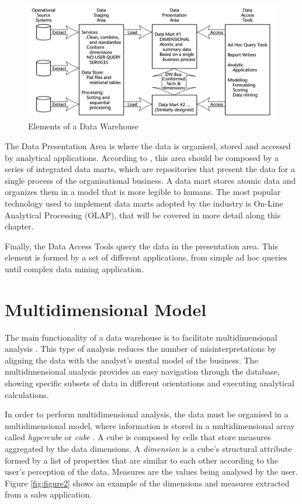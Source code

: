 \begin{figure}[ht]
\centering
\includegraphics[width=.8\textwidth]{../elements_data_warehouse.png}
\caption{Elements of a Data Warehouse \cite{Kimball2011}}
\label{fig:figure1}
\end{figure}
 
The Data Presentation Area is where the data is organised, stored and accessed by analytical applications. According to \cite{Kimball2011}, this area should be composed by a series of integrated data marts, which are repositories that present the data for a single process of the organisational business. A data mart stores atomic data and organizes them in a model that is more legible to humans. The most popular technology used to implement data marts adopted by the industry is On-Line Analytical Processing (OLAP), that will be covered in more detail along this chapter. 

Finally, the Data Access Tools query the data in the presentation area. This element is formed by a set of different applications, from simple ad hoc queries until complex data mining application.

\section{Multidimensional Model}
The main functionality of a data warehouse is to facilitate multidimensional analysis \cite{OLAPCouncil}. This type of analysis reduces the number of misinterpretations by aligning the data with the analyst's mental model of the business. The multidimensional analysis provides an easy navigation through the database, showing specific subsets of data in different orientations and executing analytical calculations.
 
In order to perform multidimensional analysis, the data must be organised in a multidimensional model, where information is stored in a multidimensional array called \emph{hypercube} or \emph{cube} \cite{Vassiliadis1998}. A cube is composed by cells that store measures aggregated by the data dimensions. A \emph{dimension} is a cube's structural attribute formed by a list of properties that are similar to each other according to the user's perception of the data. Measures are the values being analysed by the user. Figure \ref{fig:figure2} shows an example of the dimensions and measures extracted from a sales application.

